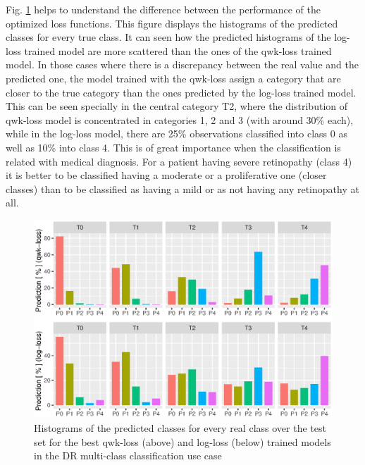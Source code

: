 Fig. \ref{loss:fig:confusion-retine} helps to understand the difference between the performance of the optimized loss functions. This figure displays the histograms of the predicted classes for every true class. It can seen how the predicted histograms of the log-loss trained model are more scattered than the ones of the qwk-loss trained model. In those cases where there is a discrepancy between the real value and the predicted one, the model trained with the qwk-loss assign a category that are closer to the true category than the ones predicted by the log-loss trained model. This can be seen specially in the central category T2, where the distribution of qwk-loss model is concentrated in categories 1, 2 and 3 (with around 30\% each), while in the log-loss model, there are 25\% observations classified into class 0 as well as 10\% into class 4. This is of great importance when the classification is related with medical diagnosis. For a patient having severe retinopathy (class 4) it is better to be classified having a moderate or a proliferative one (closer classes) than to be classified as having a mild or as not having any retinopathy at all.

\begin{figure}[!htb]
	\centering
	\includegraphics[width=\textwidth]{Figures/chapter_loss/confusion-retine.eps}
	\caption[Histograms of DR prediction (qwk-loss vs log-loss)]{Histograms of the predicted classes for every real class over the test set for the best qwk-loss (above) and log-loss (below) trained models in the DR multi-class classification use case}
	\label{loss:fig:confusion-retine}
\end{figure}

